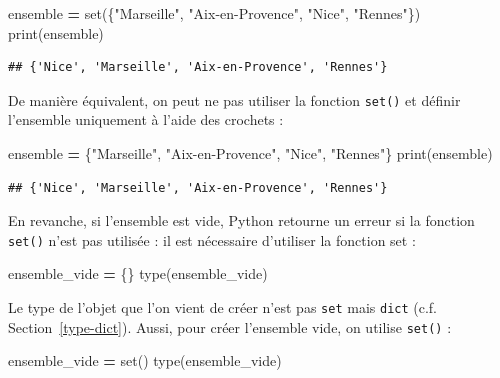\documentclass[12pt,]{book}
\newenvironment{Shaded}{\begin{snugshade}}{\end{snugshade}}
\newcommand{\StringTok}[1]{\textcolor[rgb]{0.31,0.60,0.02}{#1}}
\newcommand{\OperatorTok}[1]{\textcolor[rgb]{0.81,0.36,0.00}{\textbf{#1}}}
\newcommand{\BuiltInTok}[1]{#1}
\newcommand{\NormalTok}[1]{#1}
\numberwithin{equation}{section}
\numberwithin{countremarque}{section}
\begin{document}
\begin{Shaded}
\begin{Highlighting}[]
\NormalTok{ensemble }\OperatorTok{=} \BuiltInTok{set}\NormalTok{(\{}\StringTok{"Marseille"}\NormalTok{, }\StringTok{"Aix-en-Provence"}\NormalTok{, }\StringTok{"Nice"}\NormalTok{, }\StringTok{"Rennes"}\NormalTok{\})}
\BuiltInTok{print}\NormalTok{(ensemble)}
\end{Highlighting}
\end{Shaded}

\begin{lstlisting}
## {'Nice', 'Marseille', 'Aix-en-Provence', 'Rennes'}
\end{lstlisting}

De manière équivalent, on peut ne pas utiliser la fonction
\texttt{set()} et définir l'ensemble uniquement à l'aide des crochets :

\begin{Shaded}
\begin{Highlighting}[]
\NormalTok{ensemble }\OperatorTok{=}\NormalTok{ \{}\StringTok{"Marseille"}\NormalTok{, }\StringTok{"Aix-en-Provence"}\NormalTok{, }\StringTok{"Nice"}\NormalTok{, }\StringTok{"Rennes"}\NormalTok{\}}
\BuiltInTok{print}\NormalTok{(ensemble)}
\end{Highlighting}
\end{Shaded}

\begin{lstlisting}
## {'Nice', 'Marseille', 'Aix-en-Provence', 'Rennes'}
\end{lstlisting}

En revanche, si l'ensemble est vide, Python retourne un erreur si la
fonction \texttt{set()} n'est pas utilisée : il est nécessaire
d'utiliser la fonction set :

\begin{Shaded}
\begin{Highlighting}[]
\NormalTok{ensemble_vide }\OperatorTok{=}\NormalTok{ \{\}}
\BuiltInTok{type}\NormalTok{(ensemble_vide)}
\end{Highlighting}
\end{Shaded}

Le type de l'objet que l'on vient de créer n'est pas \texttt{set} mais
\texttt{dict} (c.f. Section~\ref{type-dict}). Aussi, pour créer
l'ensemble vide, on utilise \texttt{set()} :

\begin{Shaded}
\begin{Highlighting}[]
\NormalTok{ensemble_vide }\OperatorTok{=} \BuiltInTok{set}\NormalTok{()}
\BuiltInTok{type}\NormalTok{(ensemble_vide)}
\end{Highlighting}
\end{Shaded}
\end{document}
